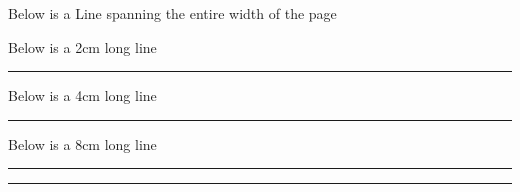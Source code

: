 \documentclass{article}
\newcommand{\hlinelong}[1][0.4pt]{\noindent\makebox[\linewidth]{\rule{\paperwidth}{#1}}}
\newcommand{\hlineshort}[1][\textwidth]{
		\noindent\rule{#1}{0.4pt}%
	}
\begin{document}
Below is a Line spanning the entire width of the page

\noindent\makebox[\linewidth]{\rule{\paperwidth}{0.4pt}}

Below is a 2cm long line

\noindent\rule{2cm}{0.4pt}

Below is a 4cm long line

\noindent\rule{4cm}{0.4pt}

Below is a 8cm long line

\noindent\rule{8cm}{0.4pt}

\hlineshort
\end{document}
